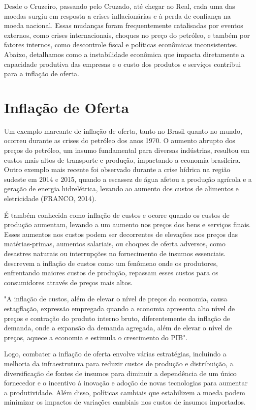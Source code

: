 \documentclass[12pt,oneside,a4paper,chapter=TITLE,english,brazil,sumario=abnt-6027-2012]{abntex2}
\begin{document}
Desde o Cruzeiro, passando pelo Cruzado, até chegar ao Real, cada uma das moedas surgiu em resposta a crises inflacionárias e à perda de confiança na moeda nacional. Essas mudanças foram frequentemente catalisadas por eventos externos, como crises internacionais, choques no preço do petróleo, e também por fatores internos, como descontrole fiscal e políticas econômicas inconsistentes. Abaixo, detalhamos como a instabilidade econômica que impacta diretamente a capacidade produtiva das empresas e o custo dos produtos e serviços contribui para a inflação de oferta.

\section{Inflação de Oferta}

Um exemplo marcante de inflação de oferta, tanto no Brasil quanto no mundo, ocorreu durante as crises do petróleo dos anos 1970. O aumento abrupto dos preços do petróleo, um insumo fundamental para diversas indústrias, resultou em custos mais altos de transporte e produção, impactando a economia brasileira. Outro exemplo mais recente foi observado durante a crise hídrica na região sudeste em 2014 e 2015, quando a escassez de água afetou a produção agrícola e a geração de energia hidrelétrica, levando ao aumento dos custos de alimentos e eletricidade (FRANCO, 2014).

É também conhecida como inflação de custos e ocorre quando os custos de produção aumentam, levando a um aumento nos preços dos bens e serviços finais. Esses aumentos nos custos podem ser decorrentes de elevações nos preços das matérias-primas, aumentos salariais, ou choques de oferta adversos, como desastres naturais ou interrupções no fornecimento de insumos essenciais.  descrevem a inflação de custos como um fenômeno onde os produtores, enfrentando maiores custos de produção, repassam esses custos para os consumidores através de preços mais altos.

"A inflação de custos, além de elevar o nível de preços da economia, causa estagflação, expressão empregada quando a economia apresenta alto nível de preços e contração do produto interno bruto, diferentemente da inflação de demanda, onde a expansão da demanda agregada, além de elevar o nível de preços, aquece a economia e estimula o crescimento do PIB". \cite{cortapasso_estagflacao}

Logo, combater a inflação de oferta envolve várias estratégias, incluindo a melhoria da infraestrutura para reduzir custos de produção e distribuição, a diversificação de fontes de insumos para diminuir a dependência de um único fornecedor e o incentivo à inovação e adoção de novas tecnologias para aumentar a produtividade. Além disso, políticas cambiais que estabilizem a moeda podem minimizar os impactos de variações cambiais nos custos de insumos importados. 
\end{document}

